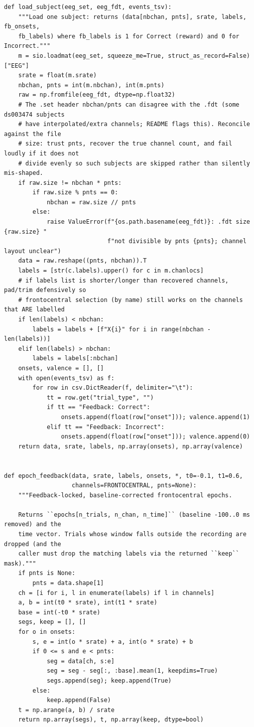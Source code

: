 \begin{lstlisting}[caption={mrl\_trace/biosignal.py},label={lst:siox-src-biosignal}]
def load_subject(eeg_set, eeg_fdt, events_tsv):
    """Load one subject: returns (data[nbchan, pnts], srate, labels, fb_onsets,
    fb_labels) where fb_labels is 1 for Correct (reward) and 0 for Incorrect."""
    m = sio.loadmat(eeg_set, squeeze_me=True, struct_as_record=False)["EEG"]
    srate = float(m.srate)
    nbchan, pnts = int(m.nbchan), int(m.pnts)
    raw = np.fromfile(eeg_fdt, dtype=np.float32)
    # The .set header nbchan/pnts can disagree with the .fdt (some ds003474 subjects
    # have interpolated/extra channels; README flags this). Reconcile against the file
    # size: trust pnts, recover the true channel count, and fail loudly if it does not
    # divide evenly so such subjects are skipped rather than silently mis-shaped.
    if raw.size != nbchan * pnts:
        if raw.size % pnts == 0:
            nbchan = raw.size // pnts
        else:
            raise ValueError(f"{os.path.basename(eeg_fdt)}: .fdt size {raw.size} "
                             f"not divisible by pnts {pnts}; channel layout unclear")
    data = raw.reshape((pnts, nbchan)).T
    labels = [str(c.labels).upper() for c in m.chanlocs]
    # if labels list is shorter/longer than recovered channels, pad/trim defensively so
    # frontocentral selection (by name) still works on the channels that ARE labelled
    if len(labels) < nbchan:
        labels = labels + [f"X{i}" for i in range(nbchan - len(labels))]
    elif len(labels) > nbchan:
        labels = labels[:nbchan]
    onsets, valence = [], []
    with open(events_tsv) as f:
        for row in csv.DictReader(f, delimiter="\t"):
            tt = row.get("trial_type", "")
            if tt == "Feedback: Correct":
                onsets.append(float(row["onset"])); valence.append(1)
            elif tt == "Feedback: Incorrect":
                onsets.append(float(row["onset"])); valence.append(0)
    return data, srate, labels, np.array(onsets), np.array(valence)


def epoch_feedback(data, srate, labels, onsets, *, t0=-0.1, t1=0.6,
                   channels=FRONTOCENTRAL, pnts=None):
    """Feedback-locked, baseline-corrected frontocentral epochs.

    Returns ``epochs[n_trials, n_chan, n_time]`` (baseline -100..0 ms removed) and the
    time vector. Trials whose window falls outside the recording are dropped (and the
    caller must drop the matching labels via the returned ``keep`` mask)."""
    if pnts is None:
        pnts = data.shape[1]
    ch = [i for i, l in enumerate(labels) if l in channels]
    a, b = int(t0 * srate), int(t1 * srate)
    base = int(-t0 * srate)
    segs, keep = [], []
    for o in onsets:
        s, e = int(o * srate) + a, int(o * srate) + b
        if 0 <= s and e < pnts:
            seg = data[ch, s:e]
            seg = seg - seg[:, :base].mean(1, keepdims=True)
            segs.append(seg); keep.append(True)
        else:
            keep.append(False)
    t = np.arange(a, b) / srate
    return np.array(segs), t, np.array(keep, dtype=bool)



\end{lstlisting}
